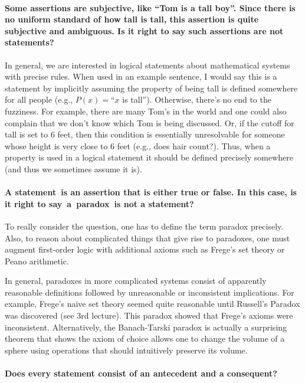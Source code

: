 \documentclass[10pt,english]{article}
\begin{document}
\paragraph{Some assertions are subjective, like ``Tom is a tall boy''. Since there is no uniform standard of how tall is tall, this assertion is quite subjective and ambiguous. Is it right to say such assertions are not statements?}

In general, we are interested in logical statements about mathematical systems with precise rules.  When used in an example sentence, I would say this is a statement by implicitly assuming the property of being tall is defined somewhere for all people (e.g., $P(x)=$``$x$ is tall'').  Otherwise, there's no end to the fuzziness.  For example, there are many Tom's in the world and one could also complain that we don't know which Tom is being discussed.  Or, if the cutoff for tall is set to 6 feet, then this condition is essentially unresolvable for someone whose height is very close to 6 feet (e.g., does hair count?). Thus, when a property is used in a logical statement it should be defined precisely somewhere (and thus we sometimes assume it is).

\paragraph{A statement is an assertion that is either true or false. In this case, is it right to say a paradox is not a statement?}

To really consider the question, one has to define the term paradox precisely.
Also, to reason about complicated things that give rise to paradoxes, one must augment first-order logic with additional axioms such as Frege's set theory or Peano arithmetic.

In general, paradoxes in more complicated systems consist of apparently reasonable definitions followed by unreasonable or inconsistent implications.  For example, Frege's naive set theory seemed quite reasonable until Russell's Paradox was discovered (see 3rd lecture).  This paradox showed that Frege's axioms were inconsistent.  Alternatively,  the Banach-Tarski paradox is actually a surprising theorem that shows the axiom of choice allows one to change the volume of a sphere using operations that should intuitively preserve its volume.


\paragraph{Does every statement consist of an antecedent and a consequent?}
\end{document}
